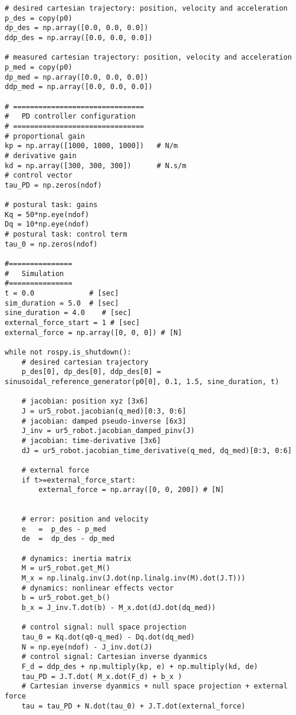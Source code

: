 \begin{lstlisting}
# desired cartesian trajectory: position, velocity and acceleration
p_des = copy(p0)
dp_des = np.array([0.0, 0.0, 0.0])
ddp_des = np.array([0.0, 0.0, 0.0])

# measured cartesian trajectory: position, velocity and acceleration
p_med = copy(p0)
dp_med = np.array([0.0, 0.0, 0.0])
ddp_med = np.array([0.0, 0.0, 0.0])

# ===============================
#   PD controller configuration
# ===============================
# proportional gain
kp = np.array([1000, 1000, 1000])   # N/m
# derivative gain   
kd = np.array([300, 300, 300])      # N.s/m
# control vector
tau_PD = np.zeros(ndof)    

# postural task: gains
Kq = 50*np.eye(ndof)
Dq = 10*np.eye(ndof)
# postural task: control term
tau_0 = np.zeros(ndof)

#===============
#   Simulation
#===============
t = 0.0             # [sec] 
sim_duration = 5.0  # [sec]
sine_duration = 4.0    # [sec]
external_force_start = 1 # [sec]
external_force = np.array([0, 0, 0]) # [N]

while not rospy.is_shutdown():
    # desired cartesian trajectory
    p_des[0], dp_des[0], ddp_des[0] = sinusoidal_reference_generator(p0[0], 0.1, 1.5, sine_duration, t)

    # jacobian: position xyz [3x6]
    J = ur5_robot.jacobian(q_med)[0:3, 0:6]  
    # jacobian: damped pseudo-inverse [6x3]
    J_inv = ur5_robot.jacobian_damped_pinv(J)   
    # jacobian: time-derivative [3x6]
    dJ = ur5_robot.jacobian_time_derivative(q_med, dq_med)[0:3, 0:6]

    # external force
    if t>=external_force_start:
        external_force = np.array([0, 0, 200]) # [N]
    

    # error: position and velocity
    e 	=  p_des - p_med
    de 	=  dp_des - dp_med    

    # dynamics: inertia matrix
    M = ur5_robot.get_M()
    M_x = np.linalg.inv(J.dot(np.linalg.inv(M).dot(J.T)))
    # dynamics: nonlinear effects vector
    b = ur5_robot.get_b()
    b_x = J_inv.T.dot(b) - M_x.dot(dJ.dot(dq_med))

    # control signal: null space projection
    tau_0 = Kq.dot(q0-q_med) - Dq.dot(dq_med)
    N = np.eye(ndof) - J_inv.dot(J)
    # control signal: Cartesian inverse dyanmics
    F_d = ddp_des + np.multiply(kp, e) + np.multiply(kd, de)
    tau_PD = J.T.dot( M_x.dot(F_d) + b_x ) 
    # Cartesian inverse dyanmics + null space projection + external force
    tau = tau_PD + N.dot(tau_0) + J.T.dot(external_force)
    

\end{lstlisting}
